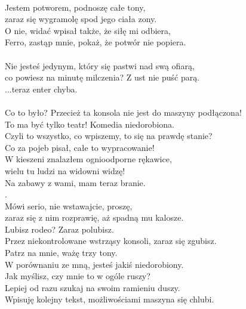\\

\charmik{}
Jestem potworem, podnoszę całe tony,\\
zaraz się wygramolę spod jego ciała zony.\\
O nie, widać wpisał także, że siłę mi odbiera,\\
Ferro, zastąp mnie, pokaż, że potwór nie popiera.\\

\\

\charfer{}
Nie jesteś jedynym, który się pastwi nad swą ofiarą,\\
co powiesz na minutę milczenia? Z ust nie puść parą.\\
 ...teraz enter chyba.\\

\\

\charfer{}
Co to było? Przecież ta konsola nie jest do maszyny podłączona!\\
To ma być tylko teatr! Komedia niedorobiona.\\
Czyli to wszystko, co wpiszemy, to się na prawdę stanie?\\
Co za pojeb pisał, całe to wypracowanie!\\

\chardok{}
W kieszeni znalazłem ognioodporne rękawice,\\
wielu tu ludzi na widowni widzę!\\
Na zabawy z wami, mam teraz branie.\\
.\\

\charfer{}
Mówi serio, nie wstawajcie, proszę,\\
zaraz się z nim rozprawię, aż spadną mu kalosze.\\
Lubisz rodeo? Zaraz polubisz.\\
Przez niekontrolowane wstrząsy konsoli, zaraz się zgubisz.\\
Patrz na mnie, ważę trzy tony.\\
W porównaniu ze mną, jesteś jakiś niedorobiony.\\
Jak myślisz, czy mnie to w ogóle ruszy?\\
Lepiej od razu szukaj na swoim ramieniu duszy.\\
Wpisuję kolejny tekst, możliwościami maszyna się chlubi.\\
\\

